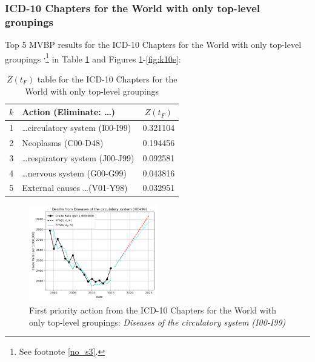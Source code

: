 \documentclass[10pt, a4paper, twocolumn]{IEEEconf}
\begin{document}
\clearpage

\subsubsection{ICD-10 Chapters for the World with only top-level groupings}

Top 5 MVBP results for the ICD-10 Chapters for the World with only top-level groupings \citep{whomortality}\textsuperscript{,}\footnote{See footnote \ref{no_s3}.} in Table \ref{table:ztable10} and Figures \ref{fig:k10a}-\ref{fig:k10e}:

\begin{table}[H]
  \centering
  \begin{tabular}{clc}
    \toprule
      $k$ & Action (Eliminate: \ldots) & $Z(t_F)$ \\
    \midrule
      1 &         \ldots circulatory system (I00-I99) & 0.321104 \\
      2 &                         Neoplasms (C00-D48) & 0.194456 \\
      3 &         \ldots respiratory system (J00-J99) & 0.092581 \\
      4 &             \ldots nervous system (G00-G99) & 0.043816 \\
      5 &            External causes \ldots (V01-Y98) & 0.032951 \\
    \bottomrule
  \end{tabular}
  \caption{$Z(t_F)$ table for the ICD-10 Chapters for the World with only top-level groupings}
  \label{table:ztable10}
\end{table}

\begin{figure}[H]
  \centering
  \includegraphics[width=0.5\textwidth]{results/WORLD_ICD10_CHAPTER_ROOTS/Diseases_of_the_circulatory_system_I00-I99_ets.png}
  \caption{First priority action from the ICD-10 Chapters for the World with only top-level groupings: \textit{Diseases of the circulatory system (I00-I99)}}\label{fig:k10a}
\end{figure}
\end{document}
